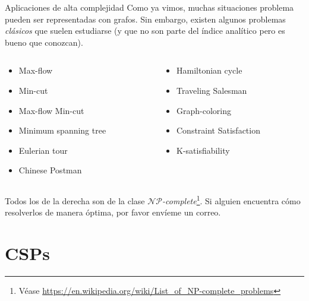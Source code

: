 \documentclass[spanish, c]{beamer}
\begin{document}
\begin{frame}[t]{Aplicaciones de alta complejidad}
    \vspace{-2ex}
    Como ya vimos, muchas situaciones problema pueden ser representadas con grafos. Sin embargo, existen algunos problemas \textit{clásicos} que suelen estudiarse (y que no son parte del índice analítico pero es bueno que conozcan).
    \bigskip
    \begin{columns}
        \begin{column}{0.5\textwidth}
            \begin{itemize}
                \slshape
                \item Max-flow
                \item Min-cut
                \item Max-flow Min-cut
                \item Minimum spanning tree
                \item Eulerian tour
                \item Chinese Postman
            \end{itemize}
        \end{column}
        \begin{column}{0.5\textwidth}
            \begin{itemize}
                \slshape
                \item Hamiltonian cycle
                \item Traveling Salesman
                \item Graph-coloring
                \item Constraint Satisfaction
                \item K-satisfiability
            \end{itemize}
        \end{column}
    \end{columns}

    \bigskip

    Todos los de la derecha son de la clase $\mathcal{NP}$\textit{-complete}\footnote{Véase \url{https://en.wikipedia.org/wiki/List\_of\_NP-complete\_problems}}. Si alguien encuentra cómo resolverlos de manera óptima, por favor envíeme un correo.

\end{frame}

\section{CSPs}
\end{document}
